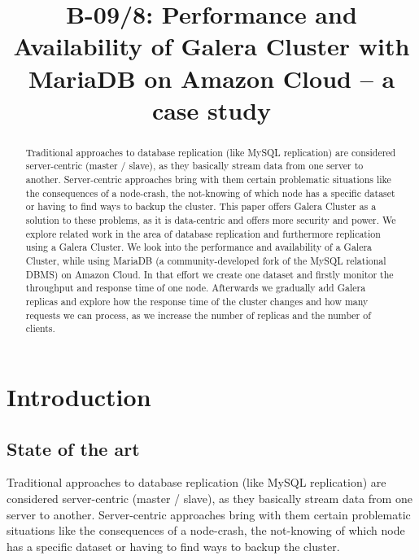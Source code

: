 \documentclass{sig-alternate}
\begin{document}

\title{B-09/8: Performance and Availability of Galera Cluster with MariaDB on Amazon Cloud – a case study}



\maketitle
\begin{abstract}
Traditional approaches to database replication (like MySQL replication) are considered server-centric (master / slave), as they basically stream data from one server to another. Server-centric approaches bring with them certain problematic situations like the consequences of a node-crash, the not-knowing of which node has a specific dataset or having to find ways to backup the cluster. This paper offers Galera Cluster as a solution to these problems, as it is data-centric and offers more security and power. We explore related work in the area of database replication and furthermore replication using a Galera Cluster. We look into the performance and availability of a Galera Cluster, while using MariaDB (a community-developed fork of the MySQL relational DBMS) on Amazon Cloud. In that effort we create one dataset and firstly monitor the throughput and response time of one node. Afterwards we gradually add Galera replicas and explore how the response time of the cluster changes and how many requests we can process, as we increase the number of replicas and the number of clients.
\end{abstract}


\section{Introduction}
\subsection{State of the art}
Traditional approaches to database replication (like MySQL replication) are considered server-centric (master / slave), as they basically stream data from one server to another. Server-centric approaches bring with them certain problematic situations like the consequences of a node-crash, the not-knowing of which node has a specific dataset or having to find ways to backup the cluster.
\end{document}
